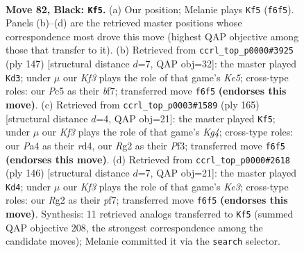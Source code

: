 \documentclass[11pt]{article}
\begin{document}
\clearpage

\begin{figure}[p]\centering
\begin{subfigure}{0.46\textwidth}\centering
\resizebox{\linewidth}{!}{%
\newchessgame
\chessboard[
  setfen={8/8/5k2/2p5/p2p4/3K4/6r1/8 b - - 5 82},
  showmover=false,
  pgfstyle=straightmove, color=movearrow, markmove={f6-f5}
]}
\caption{}
\end{subfigure}\hfill
\begin{subfigure}{0.46\textwidth}\centering
\resizebox{\linewidth}{!}{%
\newchessgame
\chessboard[
  setfen={8/5B2/8/6p1/1p2k1Kp/8/8/8 b - - 11 74},
  showmover=false,
  pgfstyle=straightmove, color=movearrow, markmove={e4-d3}
]}
\caption{}
\end{subfigure}
\\[4pt]
\begin{subfigure}{0.46\textwidth}\centering
\resizebox{\linewidth}{!}{%
\newchessgame
\chessboard[
  setfen={8/8/8/6k1/3R4/5pp1/7p/7K b - - 3 83},
  showmover=false,
  pgfstyle=straightmove, color=movearrow, markmove={g5-f5}
]}
\caption{}
\end{subfigure}\hfill
\begin{subfigure}{0.46\textwidth}\centering
\resizebox{\linewidth}{!}{%
\newchessgame
\chessboard[
  setfen={8/5p2/8/3p4/7k/4K2P/6P1/8 w - - 4 74},
  showmover=false,
  pgfstyle=straightmove, color=movearrow, markmove={e3-d4}
]}
\caption{}
\end{subfigure}
\caption{\textbf{Move 82, Black: \texttt{Kf5}.} (a) Our position; Melanie plays \texttt{Kf5} (\texttt{f6f5}). Panels (b)--(d) are the retrieved master positions whose correspondence most drove this move (highest QAP objective among those that transfer to it). (b) Retrieved from \texttt{ccrl\_top\_p0000\#3925} (ply 147) [structural distance $d$=7, QAP obj=32]: the master played \texttt{Kd3}; under $\mu$ our \emph{Kf3} plays the role of that game's \emph{Ke5}; cross-type roles: our \emph{P}c5 as their \emph{b}f7; transferred move \texttt{f6f5} \textbf{(endorses this move)}. (c) Retrieved from \texttt{ccrl\_top\_p0003\#1589} (ply 165) [structural distance $d$=4, QAP obj=21]: the master played \texttt{Kf5}; under $\mu$ our \emph{Kf3} plays the role of that game's \emph{Kg4}; cross-type roles: our \emph{P}a4 as their \emph{r}d4, our \emph{R}g2 as their \emph{P}f3; transferred move \texttt{f6f5} \textbf{(endorses this move)}. (d) Retrieved from \texttt{ccrl\_top\_p0000\#2618} (ply 146) [structural distance $d$=7, QAP obj=21]: the master played \texttt{Kd4}; under $\mu$ our \emph{Kf3} plays the role of that game's \emph{Ke3}; cross-type roles: our \emph{R}g2 as their \emph{p}f7; transferred move \texttt{f6f5} \textbf{(endorses this move)}. Synthesis: 11 retrieved analogs transferred to \texttt{Kf5} (summed QAP objective 208, the strongest correspondence among the candidate moves); Melanie committed it via the \texttt{search} selector.}
\label{fig:thought-m163}
\end{figure}
\end{document}
